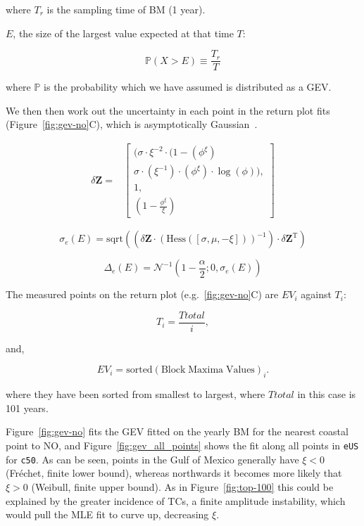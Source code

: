 where $T_r$ is the sampling time of BM (1 year).

$E$, the size of the largest value expected at that time $T$:

\begin{equation}
\mathbb{P}(X>E) \equiv \frac{T_r}{T}
\end{equation}

where $\mathbb{P}$ is the probability which we have assumed is
distributed as a GEV.

We then then work out the uncertainty in each point in the
return plot fits (Figure~\ref{fig:gev-no}C), which is asymptotically
Gaussian~\cite{doob1935limiting}.

\begin{align}
\delta \mathbf{Z} = & \left[ \begin{array}{l}(\sigma\cdot\xi^{-2} \cdot (1-(\phi^{\xi})
            \\ \sigma \cdot (\xi^{-1})\cdot (\phi^{\xi}) \cdot \log(\phi)),\\
            1,\\
            (1- \frac{\phi^{\xi}}{\xi})
            \end{array} \right]
\end{align}

\begin{equation}
\sigma_e(E) = \mathrm{sqrt}\left(\left(\delta \mathbf{Z} \cdot \left( \mathrm{Hess}\left([\sigma, \mu, -\xi]\right)
\right)^{-1} \right) \cdot  \delta \mathbf{Z}^{\mathrm{T}}\right)
\end{equation}

\begin{equation}
\Delta_e (E) = \mathcal{N}^{-1}(1-\frac{\alpha}{2}; 0, \sigma_e(E))
\end{equation}

The measured points on the return plot (e.g.~\ref{fig:gev-no}C) are $EV_i$ against $T_i$:

\begin{equation}
T_i = \frac{Ttotal}{i} ,
\end{equation}

and,

\begin{equation}
EV_i = \mathrm{sorted(Block\; Maxima\; Values)}_i.
\end{equation}

where they have been sorted from smallest to largest, where $Ttotal$ in this
case is 101 years.


Figure~\ref{fig:gev-no} fits the GEV fitted
on the yearly BM for the nearest coastal point to NO,
and Figure~\ref{fig:gev_all_points} shows the fit along all points in \texttt{eUS}
for \texttt{c50}. As can be seen, points in the Gulf of Mexico generally have  $\xi<0$ (Fr\'echet, finite lower bound),
whereas northwards it becomes more likely that $\xi>0$ (Weibull, finite upper bound).
As in Figure~\ref{fig:top-100} this could be explained by the greater incidence of
TCs, a finite amplitude instability, which would pull the MLE fit to curve up, decreasing $\xi$.



